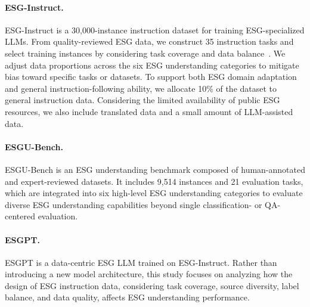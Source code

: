 \documentclass[11pt]{article}
\begin{document}
\paragraph{\textsf{ESG-Instruct}.}
\textsf{ESG-Instruct} is a 30,000-instance instruction dataset for training ESG-specialized LLMs. From quality-reviewed ESG data, we construct 35 instruction tasks and select training instances by considering task coverage and data balance~\cite{wu2025susgen}. We adjust data proportions across the six ESG understanding categories to mitigate bias toward specific tasks or datasets. To support both ESG domain adaptation and general instruction-following ability, we allocate 10\% of the dataset to general instruction data. Considering the limited availability of public ESG resources, we also include translated data and a small amount of LLM-assisted data.


\paragraph{\textsf{ESGU-Bench}.}
\textsf{ESGU-Bench} is an ESG understanding benchmark composed of human-annotated and expert-reviewed datasets. It includes 9,514 instances and 21 evaluation tasks, which are integrated into six high-level ESG understanding categories to evaluate diverse ESG understanding capabilities beyond single classification- or QA-centered evaluation.

\paragraph{\textsf{ESGPT}.}
\textsf{ESGPT} is a data-centric ESG LLM trained on \textsf{ESG-Instruct}. Rather than introducing a new model architecture, this study focuses on analyzing how the design of ESG instruction data, considering task coverage, source diversity, label balance, and data quality, affects ESG understanding performance.
\end{document}
